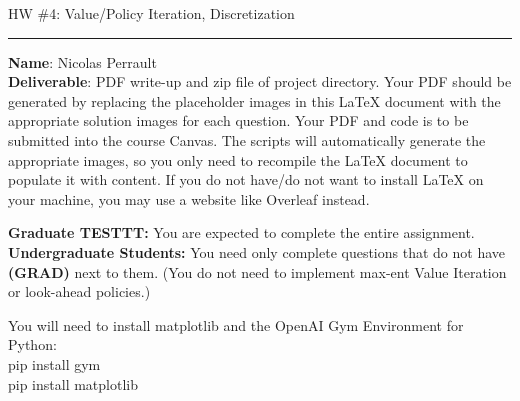 \documentclass{article}
\newcommand{\ruleskip}{\bigskip\hrule\bigskip}
\begin{document}
\pagestyle{myheadings} 

{\huge
\noindent HW \#4: Value/Policy Iteration, Discretization}\\
\ruleskip
{\bf Name}: Nicolas Perrault\\

{\bf Deliverable}:  PDF write-up and zip file of project directory.  Your PDF should be generated by replacing the placeholder images in this LaTeX document with the appropriate solution images for each question.  Your PDF and code is to be submitted into the course Canvas. The scripts will automatically generate the appropriate images, so you only need to recompile the LaTeX document to populate it with content. If you do not have/do not want to install LaTeX on your machine, you may use a website like Overleaf instead.

\textbf{Graduate TESTTT:} You are expected to complete the entire assignment.\\
\textbf{Undergraduate Students:} You need only complete questions that do not have \textbf{(GRAD)} next to them. (You do not need to implement max-ent Value Iteration or look-ahead policies.)\\

\vspace{.1in}

You will need to install matplotlib and the OpenAI Gym Environment for Python:\\
pip install gym\\
pip install matplotlib

\vspace{.2in}

\end{document}
